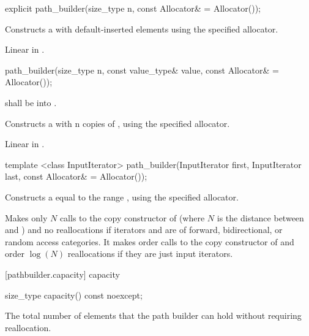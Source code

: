 %
\begin{itemdecl}
explicit path_builder(size_type n, const Allocator& = Allocator());
\end{itemdecl}
\begin{itemdescr}
\pnum
\effects
Constructs a  with  default-inserted elements using the specified allocator.

\pnum
\complexity
Linear in .
\end{itemdescr}

%
\begin{itemdecl}
path_builder(size_type n, const value_type& value,
  const Allocator& = Allocator());
\end{itemdecl}
\begin{itemdescr}
\pnum
\requires
{} shall be  into .

\pnum
\effects
Constructs a  with n copies of , using the specified allocator.

\pnum
\complexity
Linear in .
\end{itemdescr}

%
\begin{itemdecl}
template <class InputIterator>
path_builder(InputIterator first, InputIterator last,
  const Allocator& = Allocator());
\end{itemdecl}
\begin{itemdescr}
\pnum
\effects
Constructs a  equal to the range , using the specified allocator.

\pnum
\complexity
Makes only $N$ calls to the copy constructor of  (where $N$
is the distance between
and
)
and no reallocations if iterators  and  are of forward, bidirectional, or random access categories.
It makes order
calls to the copy constructor of
and order
$\log(N)$
reallocations if they are just input iterators.

\end{itemdescr}

 [pathbuilder.capacity] { capacity}%

%
\begin{itemdecl}
size_type capacity() const noexcept;
\end{itemdecl}
\begin{itemdescr}
\pnum
\returns
The total number of elements that the path builder can hold without requiring reallocation.
\end{itemdescr}

